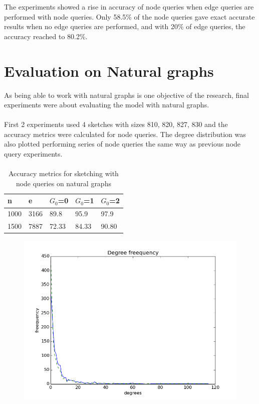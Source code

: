 \documentclass[12pt]{report}
\numberwithin{figure}{section}
\numberwithin{table}{section}
\begin{document}
The experiments showed a rise in accuracy of node queries when edge queries are performed with node queries. Only 58.5\% of the node queries gave exact accurate results when no edge queries are performed, and with 20\% of edge queries, the accuracy reached to 80.2\%.

\section{Evaluation on Natural graphs}

As being able to work with natural graphs is one objective of the research, final experiments were  about evaluating the model with natural graphs. 

\paragraph{}

First 2 experiments used 4 sketches with sizes 810, 820, 827, 830 and the accuracy metrics were calculated for node queries. The degree distribution was also plotted performing series of node queries the same way as previous node query experiments.

\paragraph{}

\begin{table}[H]
\centering
\begin{tabular}{|l|l|l|l|l|}
\hline
n    & e     & $G_0$=0 & $G_0$=1 & $G_0$=2 \\ \hline
1000 & 3166  & 89.8   & 95.9  & 97.9  \\ \hline
1500 & 7887 & 72.33   & 84.33   & 90.80  \\ \hline
\end{tabular}
\caption{Accuracy metrics for sketching with node queries on natural graphs}
\end{table}


\begin{figure}[H]
\centering
\includegraphics[scale=0.6]{images/GenForestFire-1000-035-035-n1500-e7887-sketches-810-820-827-830plot}
\end{figure}
\end{document}

